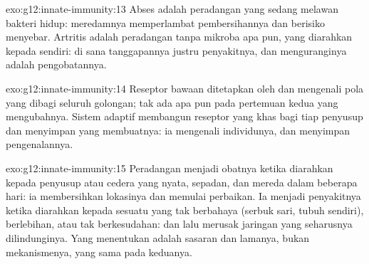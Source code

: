 \begin{solution}{exo:g12:innate-immunity:13}
Abses adalah peradangan yang sedang melawan bakteri hidup: meredamnya
memperlambat pembersihannya dan berisiko menyebar. Artritis adalah
peradangan tanpa mikroba apa pun, yang diarahkan kepada 
sendiri: di sana tanggapannya justru penyakitnya, dan menguranginya
adalah pengobatannya.
\end{solution}

\begin{solution}{exo:g12:innate-immunity:14}
Reseptor bawaan ditetapkan oleh  dan mengenali pola yang dibagi
seluruh golongan; tak ada apa pun pada pertemuan kedua yang mengubahnya.
Sistem adaptif membangun reseptor yang khas bagi tiap penyusup dan
menyimpan  yang membuatnya: ia mengenali individunya, dan menyimpan
pengenalannya.
\end{solution}

\begin{solution}{exo:g12:innate-immunity:15}
Peradangan menjadi obatnya ketika diarahkan kepada penyusup atau cedera
yang nyata, sepadan, dan mereda dalam beberapa hari: ia membersihkan
lokasinya dan memulai perbaikan. Ia menjadi penyakitnya ketika
diarahkan kepada sesuatu yang tak berbahaya (serbuk sari,  tubuh
sendiri), berlebihan, atau tak berkesudahan:  dan 
lalu merusak jaringan yang seharusnya dilindunginya. Yang menentukan
adalah sasaran dan lamanya, bukan mekanismenya, yang sama pada
keduanya.
\end{solution}

